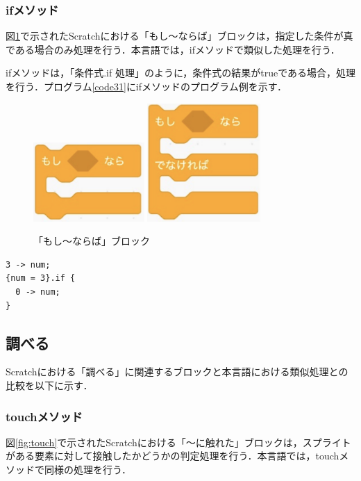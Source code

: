 \documentclass[10pt,a4j]{ltjsarticle}
\begin{document}
\subsubsection{ifメソッド}
図\ref{fig:if}で示されたScratchにおける「もし〜ならば」ブロックは，指定した条件が真である場合のみ処理を行う．本言語では，ifメソッドで類似した処理を行う．

ifメソッドは，「条件式.if 処理」のように，条件式の結果がtrueである場合，処理を行う．プログラム\ref{code31}にifメソッドのプログラム例を示す．

\begin{figure}[H]
  \centering
  \includegraphics[height=30mm]{images/if.pdf}
  \includegraphics[height=45mm]{images/if2.pdf} 
  \caption{「もし〜ならば」ブロック}
  \label{fig:if}
\end{figure}

\begin{lstlisting}[caption=ifメソッドのプログラム例, label=code31]
3 -> num;
{num = 3}.if { 
  0 -> num;
}
\end{lstlisting}

\subsection{調べる}
Scratchにおける「調べる」に関連するブロックと本言語における類似処理との比較を以下に示す．
\subsubsection{touchメソッド}
図\ref{fig:touch}で示されたScratchにおける「〜に触れた」ブロックは，スプライトがある要素に対して接触したかどうかの判定処理を行う．本言語では，touchメソッドで同様の処理を行う．
\end{document}
